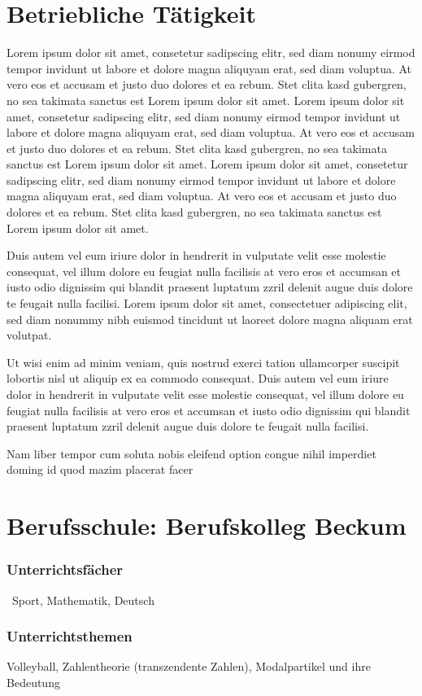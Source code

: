 \documentclass[11pt,a4paper,DIV=calc]{scrartcl}
\author{Gustav Tester} %
\begin{document}
\section*{Betriebliche Tätigkeit} %
Lorem ipsum dolor sit amet, consetetur sadipscing elitr, sed diam nonumy eirmod tempor invidunt ut labore et dolore magna aliquyam erat, sed diam voluptua. At vero eos et accusam et justo duo dolores et ea rebum. Stet clita kasd gubergren, no sea takimata sanctus est Lorem ipsum dolor sit amet. Lorem ipsum dolor sit amet, consetetur sadipscing elitr, sed diam nonumy eirmod tempor invidunt ut labore et dolore magna aliquyam erat, sed diam voluptua. At vero eos et accusam et justo duo dolores et ea rebum. Stet clita kasd gubergren, no sea takimata sanctus est Lorem ipsum dolor sit amet. Lorem ipsum dolor sit amet, consetetur sadipscing elitr, sed diam nonumy eirmod tempor invidunt ut labore et dolore magna aliquyam erat, sed diam voluptua. At vero eos et accusam et justo duo dolores et ea rebum. Stet clita kasd gubergren, no sea takimata sanctus est Lorem ipsum dolor sit amet.   

Duis autem vel eum iriure dolor in hendrerit in vulputate velit esse molestie consequat, vel illum dolore eu feugiat nulla facilisis at vero eros et accumsan et iusto odio dignissim qui blandit praesent luptatum zzril delenit augue duis dolore te feugait nulla facilisi. Lorem ipsum dolor sit amet, consectetuer adipiscing elit, sed diam nonummy nibh euismod tincidunt ut laoreet dolore magna aliquam erat volutpat.   

Ut wisi enim ad minim veniam, quis nostrud exerci tation ullamcorper suscipit lobortis nisl ut aliquip ex ea commodo consequat. Duis autem vel eum iriure dolor in hendrerit in vulputate velit esse molestie consequat, vel illum dolore eu feugiat nulla facilisis at vero eros et accumsan et iusto odio dignissim qui blandit praesent luptatum zzril delenit augue duis dolore te feugait nulla facilisi.   

Nam liber tempor cum soluta nobis eleifend option congue nihil imperdiet doming id quod mazim placerat facer


\vfill
\section*{Berufsschule: Berufskolleg Beckum}
\begin{multicols}{2}
\subsubsection*{Unterrichtsfächer}
\
Sport, Mathematik, Deutsch

\columnbreak
\subsubsection*{Unterrichtsthemen}
Volleyball, Zahlentheorie (transzendente Zahlen), Modalpartikel und ihre Bedeutung

\end{multicols}
\end{document}
